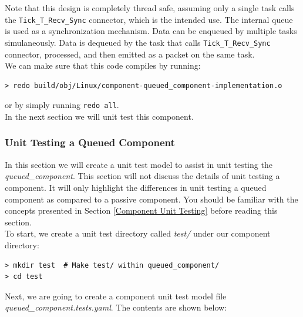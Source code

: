 Note that this design is completely thread safe, assuming only a single task calls the \texttt{Tick\_T\_Recv\_Sync} connector, which is the intended use. The internal queue is used as a synchronization mechanism. Data can be enqueued by multiple tasks simulaneously. Data is dequeued by the task that calls \texttt{Tick\_T\_Recv\_Sync} connector, processed, and then emitted as a packet on the same task. \\

We can make sure that this code compiles by running:

\vspace{5mm} %
\begin{verbatim}
> redo build/obj/Linux/component-queued_component-implementation.o
\end{verbatim}
\vspace{5mm} %

or by simply running \texttt{redo all}. \\

In the next section we will unit test this component.

\subsubsection{Unit Testing a Queued Component} \label{Unit Testing a Queued Component}

In this section we will create a unit test model to assist in unit testing the \textit{queued\_component}. This section will not discuss the details of unit testing a component. It will only highlight the differences in unit testing a queued component as compared to a passive component. You should be familiar with the concepts presented in Section \ref{Component Unit Testing} before reading this section. \\

To start, we create a unit test directory called \textit{test/} under our component directory:

\vspace{5mm} %
\begin{verbatim}
> mkdir test  # Make test/ within queued_component/
> cd test
\end{verbatim}
\vspace{5mm} %

Next, we are going to create a component unit test model file \textit{queued\_component.tests.yaml}. The contents are shown below:

